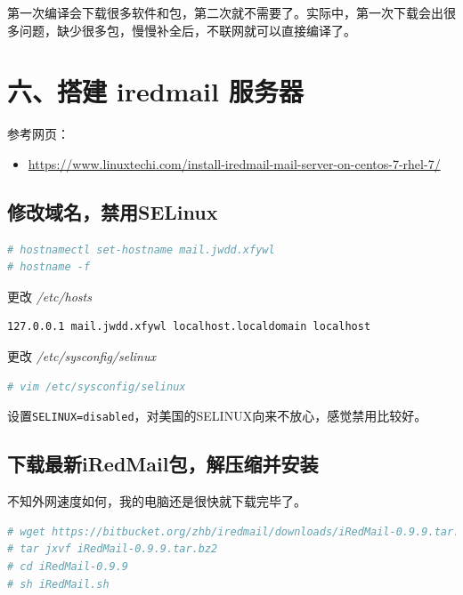 \documentclass[doctor,openright,twoside]{sjtuthesis}
\providecommand{\tightlist}{%
    \setlength{\itemsep}{0pt}\setlength{\parskip}{0pt}}
\newcommand{\passthrough}[1]{#1}
\theoremstyle{plain}
\theoremstyle{definition}
\theoremstyle{remark}
\theoremstyle{ocrenumbox}
\theoremstyle{plain}
\begin{document}
第一次编译会下载很多软件和包，第二次就不需要了。实际中，第一次下载会出很多问题，缺少很多包，慢慢补全后，不联网就可以直接编译了。

\hypertarget{iredmail-}{%
\section{六、搭建 iredmail 服务器}\label{iredmail-}}

参考网页：

\begin{itemize}
\tightlist
\item
  \url{https://www.linuxtechi.com/install-iredmail-mail-server-on-centos-7-rhel-7/}
\end{itemize}

\hypertarget{selinux}{%
\subsection{修改域名，禁用SELinux}\label{selinux}}

\begin{lstlisting}[language=bash]
# hostnamectl set-hostname mail.jwdd.xfywl
# hostname -f
\end{lstlisting}

更改 \emph{/etc/hosts}

\begin{lstlisting}
127.0.0.1 mail.jwdd.xfywl localhost.localdomain localhost
\end{lstlisting}

更改 \emph{/etc/sysconfig/selinux}

\begin{lstlisting}[language=bash]
# vim /etc/sysconfig/selinux
\end{lstlisting}

设置\passthrough{\lstinline!SELINUX=disabled!}，对美国的SELINUX向来不放心，感觉禁用比较好。

\hypertarget{iredmail}{%
\subsection{下载最新iRedMail包，解压缩并安装}\label{iredmail}}

不知外网速度如何，我的电脑还是很快就下载完毕了。

\begin{lstlisting}[language=bash]
# wget https://bitbucket.org/zhb/iredmail/downloads/iRedMail-0.9.9.tar.bz2
# tar jxvf iRedMail-0.9.9.tar.bz2
# cd iRedMail-0.9.9
# sh iRedMail.sh
\end{lstlisting}
\end{document}
